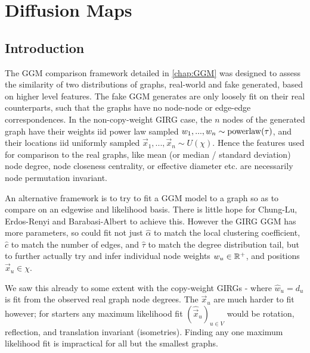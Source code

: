\chapter{Diffusion Maps}
\label{chap:diff_maps}
\minitoc
\section{Introduction}

The GGM comparison framework detailed in \cref{chap:GGM} was designed to assess the similarity of two distributions of graphs, real-world and fake generated, based on higher level features. The fake GGM generates are only loosely fit on their real counterparts, such that the graphs have no node-node or edge-edge correspondences. In the non-copy-weight GIRG case, the $n$ nodes of the generated graph have their weights iid power law sampled $w_1, ..., w_n \sim \operatorname{powerlaw}(\tau)$, and their locations iid uniformly sampled $\vec{x}_1, ..., \vec{x}_n \sim U(\chi)$. Hence the features used for comparison to the real graphs, like mean (or median / standard deviation) node degree, node closeness centrality, or effective diameter etc. are necessarily node permutation invariant.

An alternative framework is to try to fit a GGM model to a graph so as to compare on an edgewise and likelihood basis. There is little hope for Chung-Lu, Erdos-Renyi and Barabasi-Albert to achieve this. However the GIRG GGM has more parameters, so could fit not just $\hat{\alpha}$ to match the local clustering coefficient, $\hat{c}$ to match the number of edges, and $\hat{\tau}$ to match the degree distribution tail, but to further actually try and infer individual node weights $w_u \in \mathbb{R}^+$, and positions $\vec{x}_u \in \chi$. 

We saw this already to some extent with the copy-weight GIRGs - where $\hat{w}_u = d_u$ is fit from the observed real graph node degrees. The $\vec{x}_u$ are much harder to fit however; for starters any maximum likelihood fit $(\hat{\vec{x}}_u)_{u \in V}$ would be rotation, reflection, and translation invariant (isometries). Finding any one maximum likelihood fit is impractical for all but the smallest graphs.

